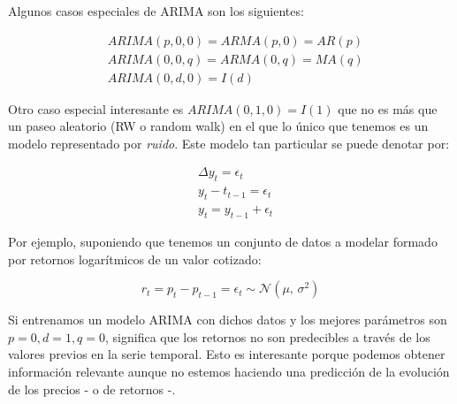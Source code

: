 Algunos casos especiales de ARIMA son los siguientes:

\begin{align*}
	&ARIMA(p, 0, 0) = ARMA(p, 0) = AR(p) \\
	&ARIMA(0, 0, q) = ARMA(0, q) = MA(q) \\
	&ARIMA(0, d, 0) = I(d)
\end{align*}

Otro caso especial interesante es $ARIMA(0, 1, 0) = I(1)$ que no es más que un paseo aleatorio (RW o random walk)\citep{wiki:paseo_aleatorio} en el que lo único que tenemos es un modelo representado por \emph{ruido}. Este modelo tan particular se puede denotar por:

\begin{equation}
\begin{aligned}
	&\Delta y_{t} = \epsilon_{t} \\
	&y_{t} - t_{t-1} = \epsilon_{t} \\
	&y_{t} = y_{t-1} + \epsilon_{t}
\end{aligned}
\end{equation}

Por ejemplo, suponiendo que tenemos un conjunto de datos a modelar formado por retornos logarítmicos de un valor cotizado: 

\begin{equation}
	r_{t} = p_{t} - p_{t-1} = \epsilon_{t} \sim \mathcal{N}(\mu,\,\sigma^{2})
\end{equation}

Si entrenamos un modelo ARIMA con dichos datos y los mejores parámetros son $p=0, d=1, q=0$, significa que los retornos no son predecibles a través de los valores previos en la serie temporal. Esto es interesante porque podemos obtener información relevante aunque no estemos haciendo una predicción de la evolución de los precios - o de retornos -. 



%
%
%
%
%
%
%
%
